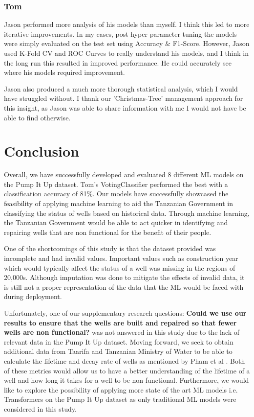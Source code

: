 \documentclass[conference]{IEEEtran}
\begin{document}
\subsubsection{Tom}

Jason performed more analysis of his models than myself. I think this led to more iterative improvements. In my cases, post hyper-parameter tuning the models were simply evaluated on the test set using Accuracy \& F1-Score. However, Jason used K-Fold CV and ROC Curves to really understand his models, and I think in the long run this resulted in improved performance. He could accurately see where his models required improvement.

Jason also produced a much more thorough statistical analysis, which I would have struggled without. I thank our 'Christmas-Tree' management approach for this insight, as Jason was able to share information with me I would not have be able to find otherwise.


\section{Conclusion}

Overall, we have successfully developed and evaluated 8 different ML models on the Pump It Up dataset. Tom's VotingClassifier performed the best with a classification accuracy of 81\%. Our  models have successfully showcased the feasibility of applying machine learning to aid the Tanzanian Government in classifying the status of wells based on historical data. Through machine learning, the Tanzanian Government would be able to act quicker in identifying and repairing wells that are non functional for the benefit of their people. 

One of the shortcomings of this study is that the dataset provided was incomplete and had invalid values. Important values such as construction year which would typically affect the status of a well was missing in the regions of 20,000s. Although imputation was done to mitigate the effects of invalid data, it is still not a proper representation of the data that the ML would be faced with during deployment.

Unfortunately, one of our supplementary research questions: \textbf{Could we use our results to ensure that the wells are built and repaired so that fewer wells are non functional?} was not answered in this study due to the lack of relevant data in the Pump It Up dataset. Moving forward, we seek to obtain additional data from Taarifa and Tanzanian Ministry of Water to be able to calculate the lifetime and decay rate of wells as mentioned by Pham et al \cite{Pham_2018}. Both of these metrics would allow us to have a better understanding of the lifetime of a well and how long it takes for a well to be non functional. Furthermore, we would like to explore the possibility of applying more state of the art ML models i.e. Transformers on the Pump It Up dataset as only traditional ML models were considered in this study. 
\end{document}
